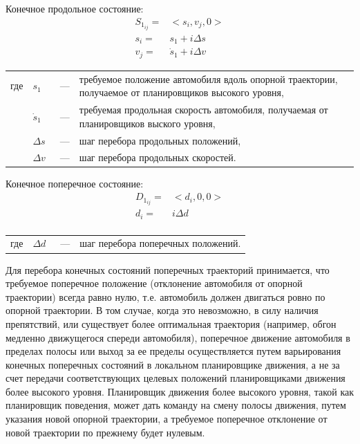 Конечное продольное состояние:
\begin{equation}
      \begin{aligned}
            S_{1_{ij}} =& <s_i, v_j, 0> \\
            s_i =& s_1 + i\Delta s \\
            v_j =& \dot{s}_1 + i\Delta v
      \end{aligned}
\end{equation}
\noindent\begin{tabularx}{\linewidth}{lllX}
      где & $s_1$       &~---& требуемое положение автомобиля вдоль опорной траектории, получаемое от планировщиков высокого уровня, \\
          & $\dot{s}_1$ &~---& требуемая продольная скорость автомобиля, получаемая от планировщиков выского уровня, \\
          & $\Delta s$  &~---& шаг перебора продольных положений, \\
          & $\Delta v$  &~---& шаг перебора продольных скоростей.
\end{tabularx}

Конечное поперечное состояние:
\begin{equation}
      \begin{aligned}
            D_{1_{ij}} =& <d_i, 0, 0> \\
            d_i =& i\Delta d \\
      \end{aligned}
\end{equation}
\noindent\begin{tabularx}{\linewidth}{lllX}
      где & $\Delta d$  &~---& шаг перебора поперечных положений.
\end{tabularx}

Для перебора конечных состояний поперечных траекторий принимается, что требуемое поперечное положение (отклонение
автомобиля от опорной траектории) всегда равно нулю, т.е. автомобиль должен двигаться ровно по опорной траектории.
В том случае, когда это невозможно, в силу наличия препятствий, или существует более оптимальная траектория (например,
обгон медленно движущегося спереди автомобиля), поперечное движение автомобиля в пределах полосы или выход за ее пределы
осуществляется путем варьирования конечных поперечных состояний в локальном планировщике движения, а не за счет передачи
соответствующих целевых положений планировщиками движения более высокого уровня. Планировщик движения более
высокого уровня, такой как планировщик поведения, может дать команду на смену полосы движения, путем указания
новой опорной траектории, а требуемое  поперечное отклонение от новой траектории по прежнему будет нулевым.

